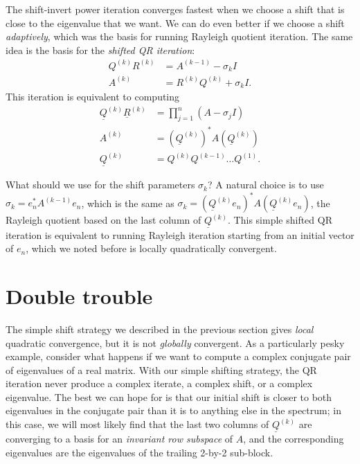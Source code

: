\documentclass[12pt, leqno]{article} %
\newcommand{\uQ}{\underline{Q}}
\newcommand{\uR}{\underline{R}}
\begin{document}
The shift-invert power iteration converges fastest when we choose a
shift that is close to the eigenvalue that we want.  We can do even
better if we choose a shift {\em adaptively}, which was the basis for
running Rayleigh quotient iteration.  The same idea is the basis
for the {\em shifted QR iteration}:
\begin{align}
  Q^{(k)} R^{(k)} &= A^{(k-1)} - \sigma_k I \label{sqr-1} \\
  A^{(k)} &= R^{(k)} Q^{(k)} + \sigma_k I. \label{sqr-2}
\end{align}
This iteration is equivalent to computing
\begin{align*}
  \uQ^{(k)} \uR^{(k)} &= \prod_{j=1}^n (A-\sigma_j I) \\
  A^{(k)} &= (\uQ^{(k)})^* A (\uQ^{(k)}) \\
  \uQ^{(k)} &= Q^{(k)} Q^{(k-1)} \ldots Q^{(1)}.
\end{align*}

What should we use for the shift parameters $\sigma_k$?  A natural
choice is to use $\sigma_k = e_n^* A^{(k-1)} e_n$, which is the same
as $\sigma_k = (\uQ^{(k)} e_n)^* A (\uQ^{(k)} e_n)$, the Rayleigh quotient
based on the last column of $\uQ^{(k)}$.  This simple shifted QR iteration
is equivalent to running Rayleigh iteration starting from an initial vector
of $e_n$, which we noted before is locally quadratically convergent.

\section{Double trouble}

The simple shift strategy we described in the previous section gives
{\em local} quadratic convergence, but it is not {\em globally} convergent.
%
As a particularly pesky example, consider what happens if we
want to compute a complex conjugate pair of eigenvalues of a real
matrix.  With our simple shifting strategy, 
the QR iteration
never produce a complex iterate, a
complex shift, or a complex eigenvalue.  The best we can hope for is
that our initial shift is closer to both eigenvalues in the conjugate
pair than it is to anything else in the spectrum; in this case, we
will most likely find that the last two columns of $\uQ^{(k)}$ are
converging to a basis for an {\em invariant row subspace} of $A$,
and the corresponding eigenvalues are the eigenvalues of the trailing
2-by-2 sub-block.
\end{document}
